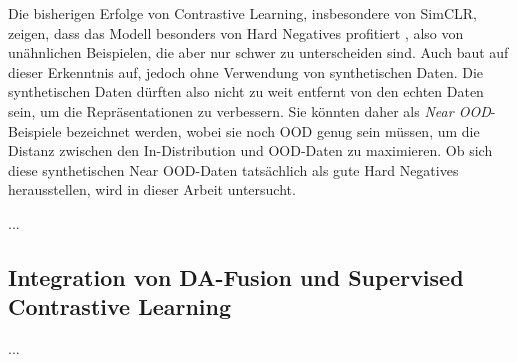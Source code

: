 Die bisherigen Erfolge von Contrastive Learning, insbesondere von SimCLR, zeigen, dass das Modell besonders von Hard Negatives profitiert \parencite{Chen2020simclr}, also von unähnlichen Beispielen, die aber nur schwer zu unterscheiden sind. Auch \parencite{Jiang2024supconhardnegatives} baut auf dieser Erkenntnis auf, jedoch ohne Verwendung von synthetischen Daten. Die synthetischen Daten dürften also nicht zu weit entfernt von den echten Daten sein, um die Repräsentationen zu verbessern. Sie könnten daher als \textit{Near OOD}-Beispiele bezeichnet werden, wobei sie noch OOD genug sein müssen, um die Distanz zwischen den In-Distribution und OOD-Daten zu maximieren. Ob sich diese synthetischen Near OOD-Daten tatsächlich als gute Hard Negatives herausstellen, wird in dieser Arbeit untersucht.


...

\subsection{Integration von DA-Fusion und Supervised Contrastive Learning} \label{sec:da-fusion-scl}





...